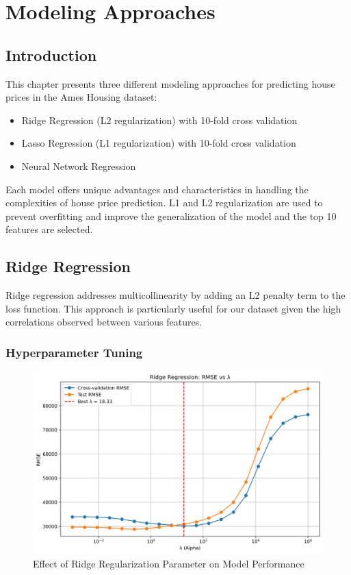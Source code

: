 \chapter{Modeling Approaches}

\section{Introduction}
This chapter presents three different modeling approaches for predicting house prices in the Ames Housing dataset:
\begin{itemize}
    \item Ridge Regression (L2 regularization) with 10-fold cross validation
    \item Lasso Regression (L1 regularization) with 10-fold cross validation
    \item Neural Network Regression 
\end{itemize}

Each model offers unique advantages and characteristics in handling the complexities of house price prediction.
L1 and L2 regularization are used to prevent overfitting and improve the generalization of the model and the top 10 features are selected.
\section{Ridge Regression}
Ridge regression addresses multicollinearity by adding an L2 penalty term to the loss function. This approach is particularly useful for our dataset given the high correlations observed between various features.

\subsection{Hyperparameter Tuning}

\begin{figure}[H]
    \centering
    \includegraphics[width=1.0\textwidth]{../figures/ridge_lambda_vs_rmse.png}
    \caption{Effect of Ridge Regularization Parameter on Model Performance}
    \label{fig:ridge_lambda}
\end{figure}


